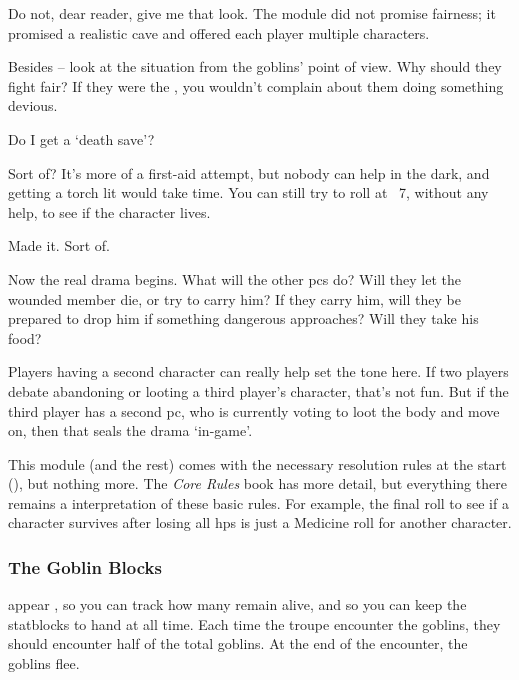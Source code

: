 \begin{multicols}{2}
\bigLine
\vspace{2em}
\noindent
Do not, dear reader, give me that look.
The module did not promise fairness; it promised a realistic cave and offered each player multiple characters.

Besides -- look at the situation from the goblins' point of view.
Why should they fight fair?
If they were the , you wouldn't complain about them doing something devious.

\bigLine

\begin{description}\sf
  \item[Player 3:]
  Do I get a `death save'?
  \item[\Glsentrytext{gm}:]
  Sort of?
  It's more of a first-aid attempt, but nobody can help in the dark, and getting a torch lit would take time.
  You can still try to roll at ~7, without any help, to see if the character lives.
  \item[Player 3:]
  Made it.
  Sort of.
\end{description}

\bigLine
\vspace{2em}

\noindent
Now the real drama begins.
What will the other \glspl{pc} do?
Will they let the wounded member die, or try to carry him?
If they carry him, will they be prepared to drop him if something dangerous approaches?
Will they take his food?

Players having a second character can really help set the tone here.
If two players debate abandoning or looting a third player's character, that's not fun.
But if the third player has a second \gls{pc}, who is currently voting to loot the body and move on, then that seals the drama `in-game'.

\bigLine

This module (and the rest) comes with the necessary resolution rules at the start (), but nothing more.
The \textit{Core Rules} book has more detail, but everything there remains a interpretation of these basic rules.
For example, the final roll to see if a character survives after losing all \glspl{hp} is just a Medicine roll for another character.

\subsubsection{The Goblin Blocks}
appear , so you can track how many remain alive, and so you can keep the \glspl{statblock} to hand at all time.
Each time the troupe encounter the goblins, they should encounter half of the total goblins.
At the end of the encounter, the goblins flee.

\end{multicols}
